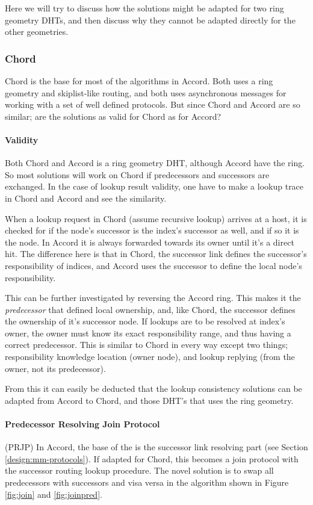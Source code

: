 Here we will try to discuss how the solutions might be adapted for two ring
 geometry DHTs, and then discuss why they cannot be adapted directly for the
 other geometries.

\subsubsection{Chord}

Chord is the base for most of the algorithms in Accord. Both uses a ring geometry
 and skiplist-like routing, and both uses asynchronous messages for working
 with a set of well defined protocols. But
 since Chord and Accord are so similar; are the solutions as valid for Chord as for
 Accord?

\paragraph{Validity}

Both Chord and Accord is a ring geometry DHT, although Accord have 
 the ring. So most solutions will work on Chord if predecessors and successors are
 exchanged. In the case of lookup result validity, one have to make a lookup trace
 in Chord and Accord and see the similarity.

When a lookup request in Chord (assume recursive lookup) arrives at a host, it is
 checked for if the node's successor is the index's successor as well, and if so
 it is the node. In Accord it is always forwarded towards its owner until it's a
 direct hit. The difference here is that in Chord, the successor link defines
 the successor's responsibility of indices, and Accord uses the successor to define
 the local node's responsibility.

This can be further investigated by reversing the Accord ring. This makes it the
 \emph{predecessor} that defined local ownership, and, like Chord, the successor
 defines the ownership of it's successor node. If lookups are to be resolved
 at index's owner, the owner must know its exact responsibility range, and thus
 having a correct predecessor. This is similar to Chord in every way except two
 things; responsibility knowledge location (owner node), and lookup replying
 (from the owner, not its predecessor).

From this it can easily be deducted that the lookup consistency solutions can be
 adapted from Accord to Chord, and those DHT's that uses the ring geometry.

\paragraph{Predecessor Resolving Join Protocol}
(PRJP)
In Accord, the base of the  is the successor link resolving
 part (see Section \ref{design:mm-protocols}). If adapted for Chord, this becomes a
  join protocol with the successor routing lookup
 procedure. The novel solution is to swap all predecessors with successors
 and visa versa in the algorithm shown in Figure \ref{fig:join} and \ref{fig:joinpred}.

